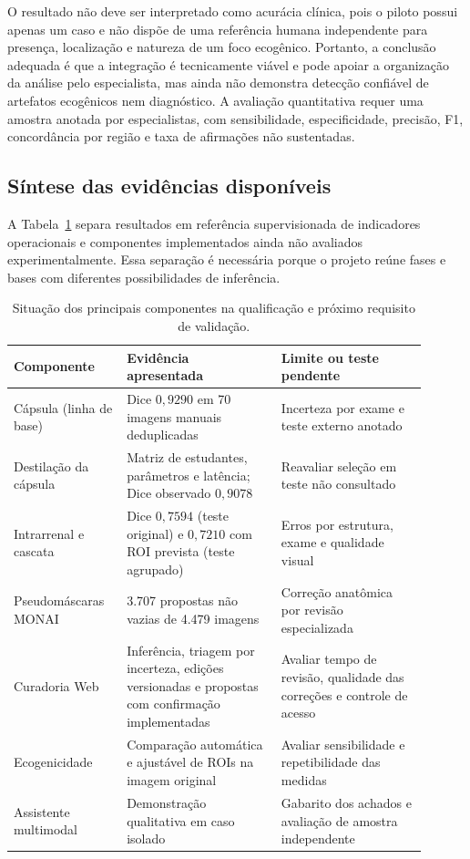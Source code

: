 \documentclass[12pt]{article}
\newif\ifversaoqualificacao
\begin{document}
O resultado não deve ser interpretado como acurácia clínica, pois o piloto
possui apenas um caso e não dispõe de uma referência humana independente para
presença, localização e natureza de um foco ecogênico. Portanto, a conclusão
adequada é que a integração é tecnicamente viável e pode apoiar a organização
da análise pelo especialista, mas ainda não demonstra detecção confiável de
artefatos ecogênicos nem diagnóstico. A avaliação quantitativa requer uma
amostra anotada por especialistas, com sensibilidade, especificidade, precisão,
F1, concordância por região e taxa de afirmações não sustentadas.

\ifversaoqualificacao
A demonstração adicional com a interface é documentada no Apêndice~\ref{app:exemplo_assistencial}.
\fi

\subsection{Síntese das evidências disponíveis}
A Tabela~\ref{tab:sintese_evidencias} separa resultados em referência supervisionada de indicadores operacionais e componentes implementados ainda não avaliados experimentalmente. Essa separação é necessária porque o projeto reúne fases e bases com diferentes possibilidades de inferência.

\begin{table}[!htbp]
\centering
\small
\caption[Síntese das evidências e limitações]{Situação dos principais componentes na qualificação e próximo requisito de validação.}
\label{tab:sintese_evidencias}
\begin{tabular}{p{0.24\linewidth}p{0.34\linewidth}p{0.32\linewidth}}
\toprule
\textbf{Componente} & \textbf{Evidência apresentada} & \textbf{Limite ou teste pendente} \\
\midrule
Cápsula (linha de base) & Dice $0{,}9290$ em 70 imagens manuais deduplicadas & Incerteza por exame e teste externo anotado \\
Destilação da cápsula & Matriz de estudantes, parâmetros e latência; Dice observado $0{,}9078$ & Reavaliar seleção em teste não consultado \\
Intrarrenal e cascata & Dice $0{,}7594$ (teste original) e $0{,}7210$ com ROI prevista (teste agrupado) & Erros por estrutura, exame e qualidade visual \\
Pseudomáscaras MONAI & 3.707 propostas não vazias de 4.479 imagens & Correção anatômica por revisão especializada \\
Curadoria Web & Inferência, triagem por incerteza, edições versionadas e propostas com confirmação implementadas & Avaliar tempo de revisão, qualidade das correções e controle de acesso \\
Ecogenicidade & Comparação automática e ajustável de ROIs na imagem original & Avaliar sensibilidade e repetibilidade das medidas \\
Assistente multimodal & Demonstração qualitativa em caso isolado & Gabarito dos achados e avaliação de amostra independente \\
\bottomrule
\end{tabular}
\end{table}
\end{document}
